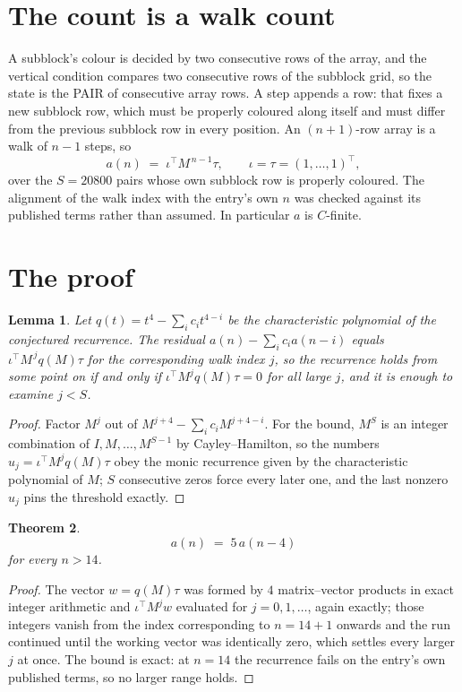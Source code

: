 \documentclass[11pt,a4paper]{article}
\theoremstyle{plain}
\newtheorem{theorem}{Theorem}
\newtheorem{lemma}[theorem]{Lemma}
\theoremstyle{definition}
\begin{document}
\section{The count is a walk count}

A subblock's colour is decided by two consecutive rows of the array, and
the vertical condition compares two consecutive rows of the subblock grid, so the state is the
PAIR of consecutive array rows. A step appends a row: that fixes a new subblock row, which
must be properly coloured along itself and must differ from the previous subblock row in every
position. An $(n+1)$-row array is a walk of $n-1$ steps, so
\[
a(n)\;=\;\iota^{\!\top}M^{\,n-1}\tau,\qquad\iota=\tau=(1,\dots,1)^{\!\top},
\]
over the $S=20800$ pairs whose own subblock row is properly coloured.
The alignment of the walk index with the entry's own $n$ was checked against its published
terms rather than assumed. In particular $a$ is $C$-finite.

\section{The proof}

\begin{lemma}\label{lem:crit}
Let $q(t)=t^{4}-\sum_i c_it^{4-i}$ be the characteristic polynomial of the
conjectured recurrence. The residual $a(n)-\sum_ic_ia(n-i)$ equals
$\iota^{\!\top}M^{\,j}q(M)\tau$ for the corresponding walk index $j$, so the recurrence
holds from some point on if and only if $\iota^{\!\top}M^{j}q(M)\tau=0$ for all large $j$,
and it is enough to examine $j<S$.
\end{lemma}

\begin{proof}
Factor $M^{j}$ out of $M^{j+4}-\sum_ic_iM^{j+4-i}$. For the bound, $M^{S}$
is an integer combination of $I,M,\dots,M^{S-1}$ by Cayley--Hamilton, so the numbers
$u_j=\iota^{\!\top}M^{j}q(M)\tau$ obey the monic recurrence given by the characteristic
polynomial of $M$; $S$ consecutive zeros force every later one, and the last nonzero $u_j$
pins the threshold exactly.
\end{proof}

\begin{theorem}
\[
a(n)\;=\;5\,a(n-4)
\]
for every $n>14$.
\end{theorem}

\begin{proof}
The vector $w=q(M)\tau$ was formed by $4$ matrix--vector products in exact integer
arithmetic and $\iota^{\!\top}M^{j}w$ evaluated for $j=0,1,\dots$, again exactly; those
integers vanish from the index corresponding to $n=14+1$ onwards and the run continued
until the working vector was identically zero, which settles every larger $j$ at once. The bound is exact: at $n=14$ the recurrence fails on the entry's own published terms, so no larger range holds.
\end{proof}
\end{document}
